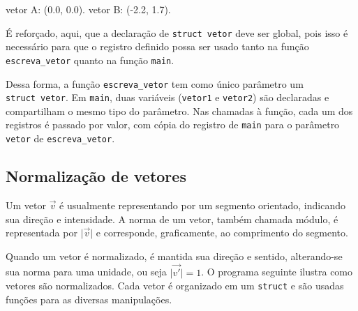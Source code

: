 \documentclass[
  11pt,
  a4paper,
]{scrbook}
\newenvironment{Shaded}{\begin{snugshade}}{\end{snugshade}}
\newcommand{\NormalTok}[1]{#1}
\begin{document}
\begin{Shaded}
\begin{Highlighting}[]
\NormalTok{vetor A: (0.0, 0.0).}
\NormalTok{vetor B: ({-}2.2, 1.7).}
\end{Highlighting}
\end{Shaded}

É reforçado, aqui, que a declaração de \texttt{struct\ vetor} deve ser
global, pois isso é necessário para que o registro definido possa ser
usado tanto na função \texttt{escreva\_vetor} quanto na função
\texttt{main}.

Dessa forma, a função \texttt{escreva\_vetor} tem como único parâmetro
um \texttt{struct\ vetor}. Em \texttt{main}, duas variáveis
(\texttt{vetor1} e \texttt{vetor2}) são declaradas e compartilham o
mesmo tipo do parâmetro. Nas chamadas à função, cada um dos registros é
passado por valor, com cópia do registro de \texttt{main} para o
parâmetro \texttt{vetor} de \texttt{escreva\_vetor}.

\subsection{Normalização de
vetores}\label{normalizauxe7uxe3o-de-vetores}

Um vetor \(\vec{v}\) é usualmente representando por um segmento
orientado, indicando sua direção e intensidade. A norma de um vetor,
também chamada módulo, é representada por \(\lvert\vec{v}\rvert\) e
corresponde, graficamente, ao comprimento do segmento.

Quando um vetor é normalizado, é mantida sua direção e sentido,
alterando-se sua norma para uma unidade, ou seja
\({\lvert\vec{v'}\rvert = 1}\). O programa seguinte ilustra como vetores
são normalizados. Cada vetor é organizado em um \texttt{struct} e são
usadas funções para as diversas manipulações.
\end{document}

